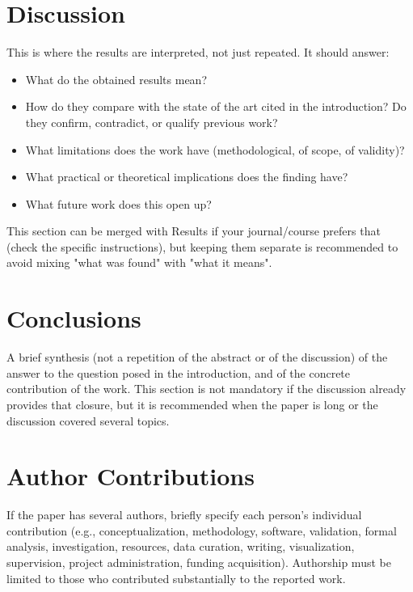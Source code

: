 \documentclass[lettersize,journal]{IEEEtran}
\begin{document}
\section{Discussion}

This is where the results are interpreted, not just repeated. It
should answer:
\begin{itemize}
\item What do the obtained results mean?
\item How do they compare with the state of the art cited in the
introduction? Do they confirm, contradict, or qualify previous work?
\item What limitations does the work have (methodological, of scope,
of validity)?
\item What practical or theoretical implications does the finding
have?
\item What future work does this open up?
\end{itemize}
This section can be merged with Results if your journal/course prefers
that (check the specific instructions), but keeping them separate is
recommended to avoid mixing "what was found" with "what it means".

\section{Conclusions}

A brief synthesis (not a repetition of the abstract or of the
discussion) of the answer to the question posed in the introduction,
and of the concrete contribution of the work. This section is not
mandatory if the discussion already provides that closure, but it is
recommended when the paper is long or the discussion covered several
topics.


\section*{Author Contributions}
If the paper has several authors, briefly specify each person's
individual contribution (e.g., conceptualization, methodology,
software, validation, formal analysis, investigation, resources, data
curation, writing, visualization, supervision, project administration,
funding acquisition). Authorship must be limited to those who
contributed substantially to the reported work.
\end{document}
